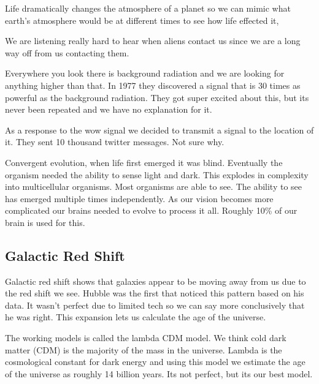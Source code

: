 \documentclass{article}
\begin{document}

Life dramatically changes the atmosphere of a planet so we can mimic what earth's atmosphere would be at different times to see how life effected it,




We are listening really hard to hear when aliens contact us since we are a long way off from us contacting them.


Everywhere you look there is background radiation and we are looking for anything higher than that. In 1977 they discovered a signal that is 30 times as powerful as the background radiation. They got super excited about this, but its never been repeated and we have no explanation for it.


As a response to the wow signal we decided to transmit a signal to the location of it. They sent 10 thousand twitter messages. Not sure why.


Convergent evolution, when life first emerged it was blind. Eventually the organism needed the ability to sense light and dark. This explodes in complexity into multicellular organisms. Most organisms are able to see. The ability to see has emerged multiple times independently. As our vision becomes more complicated our brains needed to evolve to process it all. Roughly 10\% of our brain is used for this.




\subsection{Galactic Red Shift}
\label{par:galactic_red_shift}
Galactic red shift shows that galaxies appear to be moving away from us due to the red shift we see. Hubble was the first that noticed this pattern based on his data. It wasn't perfect due to limited tech so we can say more conclusively that he was right. This expansion lets us calculate the age of the universe.

The working models is called the lambda CDM model. We think cold dark matter (CDM) is the majority of the mass in the universe. Lambda is the cosmological constant for dark energy and using this model we estimate the age of the universe as roughly 14 billion years. Its not perfect, but its our best model.
\end{document}
